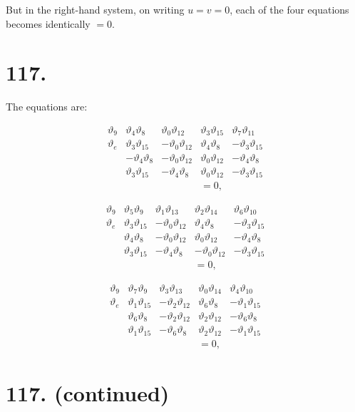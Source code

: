 \documentclass[11pt,a4paper]{article}
\newcommand{\uth}[1]{\vartheta_{#1}}
\begin{document}
But in the right-hand system, on writing $u = v = 0$, each of the four equations becomes identically $= 0$.


\newpage
\section*{117.}
\label{sec:117}

The equations are:

\[
\begin{array}{c|cccc}
\uth{9} & \uth{4}\uth{8} & \uth{0}\uth{12} & \uth{3}\uth{15} & \uth{7}\uth{11} \\
\hline
\uth{e} & \uth{3}\uth{15} & -\uth{0}\uth{12} & \uth{4}\uth{8} & -\uth{3}\uth{15} \\
& -\uth{4}\uth{8} & -\uth{0}\uth{12} & \uth{0}\uth{12} & -\uth{4}\uth{8} \\
& \uth{3}\uth{15} & -\uth{4}\uth{8} & \uth{0}\uth{12} & -\uth{3}\uth{15} \\
& & & = 0,
\end{array}
\]

\[
\begin{array}{c|cccc}
\uth{9} & \uth{5}\uth{9} & \uth{1}\uth{13} & \uth{2}\uth{14} & \uth{6}\uth{10} \\
\hline
\uth{e} & \uth{3}\uth{15} & -\uth{0}\uth{12} & \uth{4}\uth{8} & -\uth{3}\uth{15} \\
& \uth{4}\uth{8} & -\uth{0}\uth{12} & \uth{0}\uth{12} & -\uth{4}\uth{8} \\
& \uth{3}\uth{15} & -\uth{4}\uth{8} & -\uth{0}\uth{12} & -\uth{3}\uth{15} \\
& & & = 0,
\end{array}
\]

\[
\begin{array}{c|cccc}
\uth{9} & \uth{7}\uth{9} & \uth{3}\uth{13} & \uth{0}\uth{14} & \uth{4}\uth{10} \\
\hline
\uth{e} & \uth{1}\uth{15} & -\uth{2}\uth{12} & \uth{6}\uth{8} & -\uth{1}\uth{15} \\
& \uth{6}\uth{8} & -\uth{2}\uth{12} & \uth{2}\uth{12} & -\uth{6}\uth{8} \\
& \uth{1}\uth{15} & -\uth{6}\uth{8} & \uth{2}\uth{12} & -\uth{1}\uth{15} \\
& & & = 0,
\end{array}
\]

\newpage
\section*{117. (continued)}
\label{sec:117cont}
\end{document}
